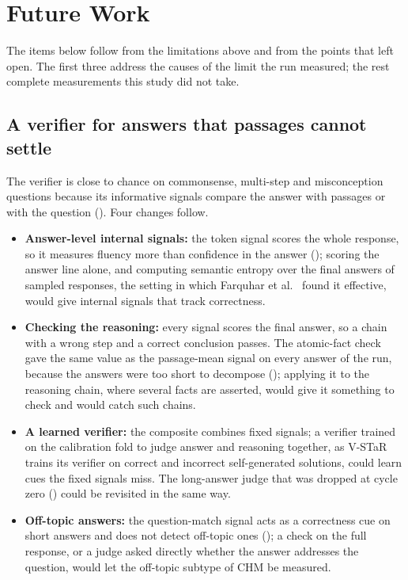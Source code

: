 \section{Future Work}
\label{sec:future-work}

The items below follow from the limitations above and from the points that  left open. The first three address the causes of the limit the run measured; the rest complete measurements this study did not take.

\subsection{A verifier for answers that passages cannot settle}
\label{sec:future-judge}

The verifier is close to chance on commonsense, multi-step and misconception questions because its informative signals compare the answer with passages or with the question (). Four changes follow.
\begin{itemize}
    \item \textbf{Answer-level internal signals:} the token signal scores the whole response, so it measures fluency more than confidence in the answer (); scoring the answer line alone, and computing semantic entropy over the final answers of sampled responses, the setting in which Farquhar et al.~\cite{farquhar2024semantic} found it effective, would give internal signals that track correctness.
    \item \textbf{Checking the reasoning:} every signal scores the final answer, so a chain with a wrong step and a correct conclusion passes. The atomic-fact check gave the same value as the passage-mean signal on every answer of the run, because the answers were too short to decompose (); applying it to the reasoning chain, where several facts are asserted, would give it something to check and would catch such chains.
    \item \textbf{A learned verifier:} the composite combines fixed signals; a verifier trained on the calibration fold to judge answer and reasoning together, as V-STaR~\cite{hosseini2024vstar} trains its verifier on correct and incorrect self-generated solutions, could learn cues the fixed signals miss. The long-answer judge that was dropped at cycle zero () could be revisited in the same way.
    \item \textbf{Off-topic answers:} the question-match signal acts as a correctness cue on short answers and does not detect off-topic ones (); a check on the full response, or a judge asked directly whether the answer addresses the question, would let the off-topic subtype of CHM be measured.
\end{itemize}

